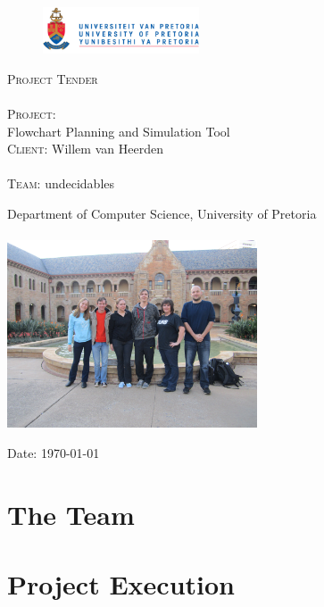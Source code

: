 \documentclass[12pt]{article}
\begin{document}
\begin{titlepage}
	\begin{center}
		
		\begin{figure}[t]
			\centering
			\includegraphics[width=175px]{UP_Logo.png}
		\end{figure}
		
		\textsc{\Huge Project Tender} \\ 

		\textsc{\huge \\Project:\\	}
		\huge Flowchart Planning and Simulation Tool
		\textsc{\Large \\Client:}
		\large Willem van Heerden\\
		\textsc{\huge \\Team:}
		\huge \textsc{}undecidables\textsc{}
		
		\small Department of Computer Science, University of Pretoria \\
		\hfill \\
		\includegraphics[width=280px]{Team.JPG}\\

	\vfill

	{\large Date: \today}		
		
		
	\end{center}
\end{titlepage}

\pagebreak
\tableofcontents

\pagebreak

\section{The Team}

\pagebreak
\section{Project Execution}

\end{document}
